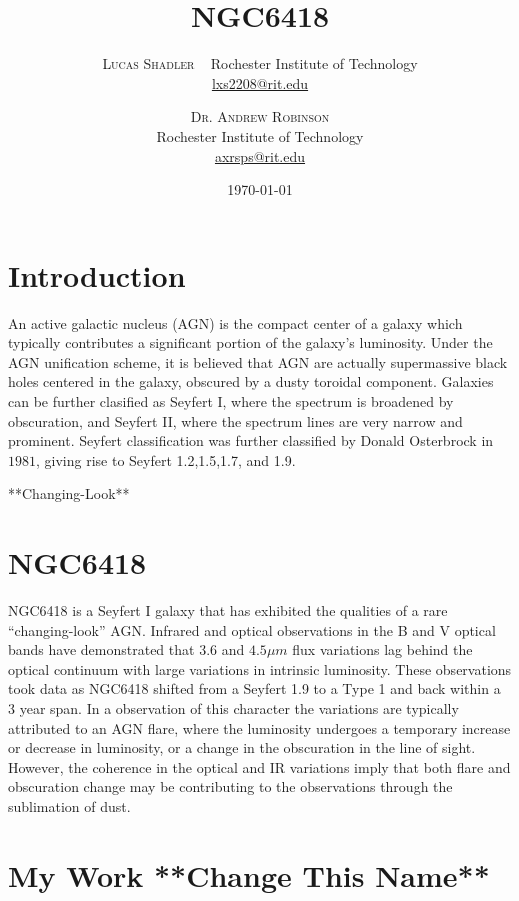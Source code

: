 \documentclass[twoside,twocolumn]{article}
\title{NGC6418} %
\author{%
\textsc{Lucas Shadler} \ %
\normalsize Rochester Institute of Technology \\ %
\normalsize \href{mailto:lxs2208@rit.edu}{lxs2208@rit.edu} %
\and %
\textsc{Dr. Andrew Robinson} \\[1ex] %
\normalsize Rochester Institute of Technology \\ %
\normalsize \href{mailto:axrsps@rit.edu}{axrsps@rit.edu} %
}
\date{\today} %
\begin{document}
\maketitle

\section{Introduction}

An active galactic nucleus (AGN) is the compact center of a galaxy which typically contributes a significant portion of the galaxy's luminosity. Under the AGN unification scheme, it is believed that AGN are actually supermassive black holes centered in the galaxy, obscured by a dusty toroidal component. Galaxies can be further clasified as Seyfert I, where the spectrum is broadened by obscuration, and Seyfert II, where the spectrum lines are very narrow and prominent. Seyfert classification was further classified by Donald Osterbrock in $1981$, giving rise to Seyfert 1.2,1.5,1.7, and 1.9.

**Changing-Look**

\section{NGC6418}

NGC6418 is a Seyfert I galaxy that has exhibited the qualities of a rare ``changing-look'' AGN. Infrared and optical observations in the B and V optical bands have 
demonstrated that $3.6$ and $4.5 \mu m$ flux variations lag behind the optical 
continuum with large variations in intrinsic luminosity. These observations took data
as NGC6418 shifted from a Seyfert 1.9 to a Type 1 and back within a 3 year span. In a observation of this character the variations are typically attributed to an AGN flare, where the luminosity undergoes a temporary increase or decrease in luminosity, or a change in the obscuration in the line of sight. However, the coherence in the optical and IR variations imply that both flare and obscuration change may be contributing to the observations through the sublimation of dust.

\section{My Work **Change This Name**}
\end{document}
